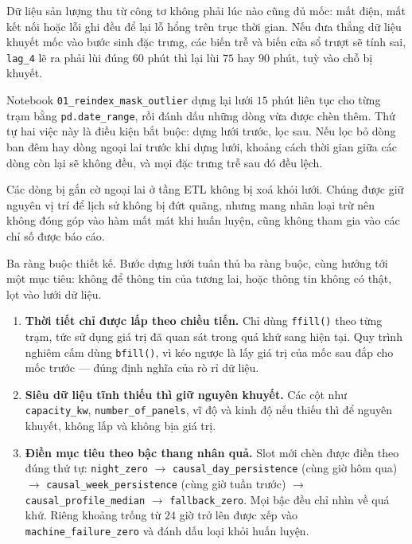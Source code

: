 \documentclass[12pt, a4paper]{report}
\begin{document}
Dữ liệu sản lượng thu từ công tơ không phải lúc nào cũng đủ mốc: mất điện, mất kết nối
hoặc lỗi ghi đều để lại lỗ hổng trên trục thời gian. Nếu đưa thẳng dữ liệu khuyết mốc
vào bước sinh đặc trưng, các biến trễ và biến cửa sổ trượt sẽ tính sai, \texttt{lag\_4}
lẽ ra phải lùi đúng $60$ phút thì lại lùi $75$ hay $90$ phút, tuỳ vào chỗ bị khuyết.

Notebook \texttt{01\_reindex\_mask\_outlier} dựng lại lưới $15$ phút liên tục cho từng trạm
bằng \texttt{pd.date\_range}, rồi đánh dấu những dòng vừa được chèn thêm. Thứ tự hai
việc này là điều kiện bắt buộc: dựng lưới trước, lọc sau. Nếu lọc bỏ dòng ban
đêm hay dòng ngoại lai trước khi dựng lưới, khoảng cách thời gian giữa các dòng còn lại
sẽ không đều, và mọi đặc trưng trễ sau đó đều lệch.

Các dòng bị gắn cờ ngoại lai ở tầng ETL không bị xoá khỏi lưới. Chúng được giữ nguyên
vị trí để lịch sử không bị đứt quãng, nhưng mang nhãn loại trừ nên không đóng góp vào
hàm mất mát khi huấn luyện, cũng không tham gia vào các chỉ số được báo cáo.

Ba ràng buộc thiết kế. Bước dựng lưới tuân thủ ba ràng buộc, cùng hướng tới một
mục tiêu: không để thông tin của tương lai, hoặc thông tin không có thật, lọt vào lưới dữ liệu.

\begin{enumerate}
    \item \textbf{Thời tiết chỉ được lấp theo chiều tiến.} Chỉ dùng \texttt{ffill()} theo
    từng trạm, tức sử dụng giá trị đã quan sát trong quá khứ sang hiện tại. Quy trình nghiêm cấm
    dùng \texttt{bfill()}, vì kéo ngược là lấy giá trị của mốc sau đắp cho mốc trước --- đúng
    định nghĩa của rò rỉ dữ liệu.
    \item \textbf{Siêu dữ liệu tĩnh thiếu thì giữ nguyên khuyết.} Các cột như
    \texttt{capacity\_kw}, \texttt{number\_of\_panels}, vĩ độ và kinh độ nếu thiếu thì để nguyên
    khuyết, không lấp và không bịa giá trị.
    \item \textbf{Điền mục tiêu theo bậc thang nhân quả.} Slot mới chèn được điền theo đúng
    thứ tự: \texttt{night\_zero} $\rightarrow$ \texttt{causal\_day\_persistence} (cùng giờ hôm qua)
    $\rightarrow$ \texttt{causal\_week\_persistence} (cùng giờ tuần trước) $\rightarrow$
    \texttt{causal\_profile\_median} $\rightarrow$ \texttt{fallback\_zero}. Mọi bậc đều chỉ nhìn về
    quá khứ. Riêng khoảng trống từ $24$ giờ trở lên được xếp vào \texttt{machine\_failure\_zero}
    và đánh dấu loại khỏi huấn luyện.
\end{enumerate}
\end{document}
